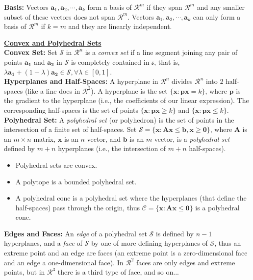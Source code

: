 {\bf Basis:} Vectors ${\mathbf a_1},{\mathbf a_2},\cdots,{\mathbf a_k}$ form a basis of $\mathcal{R}^m$ if they span $\mathcal{R}^m$ and any smaller subset of these vectors does not span $\mathcal{R}^m$. Vectors ${\mathbf a_1},{\mathbf a_2},\cdots,{\mathbf a_k}$ can only form a basis of $\mathcal{R}^m$ if $k = m$ and they are linearly independent.

\newpage \underline{\bf Convex and Polyhedral Sets} \\

{\bf Convex Set:} Set $\mathcal{S}$ in $\mathcal{R}^n$ is a {\it convex set} if a line segment joining any pair of points $\mathbf{a_1}$ and $\mathbf{a_2}$ in $\mathcal{S}$ is completely contained in $\mathcal{s}$, that is, $\lambda\mathbf{a_1} + (1-\lambda)\mathbf{a_2} \in \mathcal{S}, \forall \lambda \in [0,1]$. \\

{\bf Hyperplanes and Half-Spaces:} A hyperplane in $\mathcal{R}^n$ divides $\mathcal{R}^n$ into 2 half-spaces (like a line does in $\mathcal{R}^2$). A hyperplane is the set $\{\mathbf{x}: \mathbf{p}\mathbf{x} = k\}$, where $\mathbf{p}$ is the gradient to the hyperplane (i.e., the coefficients of our linear expression). The corresponding half-spaces is the set of points $\{\mathbf{x}: \mathbf{p}\mathbf{x} \ge k\}$ and $\{\mathbf{x}: \mathbf{p}\mathbf{x} \le k\}$. \\

{\bf Polyhedral Set:} A {\it polyhedral set} (or polyhedron) is the set of points in the intersection of a finite set of half-spaces. Set $\mathcal{S} = \{\mathbf{x}: \mathbf{A} \mathbf{x} \le \mathbf{b}, \mathbf{x} \ge \mathbf{0}\}$, where $\mathbf{A}$ is an $m \times n$ matrix, $\mathbf{x}$ is an $n$-vector, and $\mathbf{b}$ is an $m$-vector, is a {\it polyhedral set} defined by $m + n$ hyperplanes (i.e., the intersection of $m + n$ half-spaces).
\begin{itemize}
\item Polyhedral sets are convex. 
\item A polytope is a bounded polyhedral set.
\item A polyhedral cone is a polyhedral set where the hyperplanes (that define the half-spaces) pass through the origin, thus $\mathcal{C} = \{\mathbf{x}: \mathbf{A} \mathbf{x} \le \mathbf{0}\}$ is a polyhedral cone.
\end{itemize}

{\bf Edges and Faces:} An {\it edge} of a polyhedral set $\mathcal{S}$ is defined by $n-1$ hyperplanes, and a {\it face} of $\mathcal{S}$ by one of more defining hyperplanes of $\mathcal{S}$, thus an extreme point and an edge are faces (an extreme point is a zero-dimensional face and an edge a one-dimensional face).  In $\mathcal{R}^2$ faces are only edges and extreme points, but in $\mathcal{R}^3$ there is a third type of face, and so on... \\

